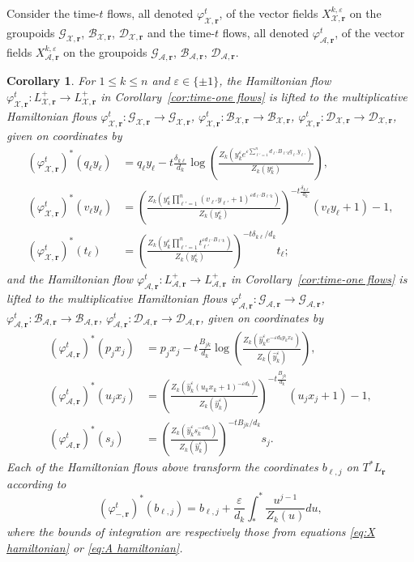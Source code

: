 \documentclass{amsart}
\newtheorem{corollary}[theorem]{Corollary}
\numberwithin{equation}{section}
\newcommand{\bfr}{{\boldsymbol{r}}}
\newcommand{\cA}{\mathcal{A}}
\newcommand{\cB}{\mathcal{B}}
\newcommand{\cD}{\mathcal{D}}
\newcommand{\cG}{\mathcal{G}}
\newcommand{\cX}{\mathcal{X}}
\begin{document}
Consider the time-$t$ flows, all denoted $\varphi_{\cX,\bfr}^t$, of the vector fields $X_{\cX,\bfr}^{k,\varepsilon}$ on the groupoids $\cG_{\cX,\bfr}$, $\cB_{\cX,\bfr}$, $\cD_{\cX,\bfr}$ and the time-$t$ flows, all denoted $\varphi_{\cA,\bfr}^t$, of the vector fields $X_{\cA,\bfr}^{k,\varepsilon}$ on the groupoids $\cG_{\cA,\bfr}$, $\cB_{\cA,\bfr}$, $\cD_{\cA,\bfr}$.
\begin{corollary}
  \label{cor:groupoid hamiltonian flows}
  For $1\le k\le n$ and $\varepsilon\in\{\pm1\}$, the Hamiltonian flow $\varphi_{\cX,\bfr}^t: L^+_{\cX,\bfr} \to L^+_{\cX,\bfr}$ in Corollary~\ref{cor:time-one flows} is lifted to the multiplicative Hamiltonian flows $\varphi_{\cX,\bfr}^t: \cG_{\cX,\bfr} \to \cG_{\cX,\bfr}$, $\varphi_{\cX,\bfr}^t: \cB_{\cX,\bfr} \to \cB_{\cX,\bfr}$, $\varphi_{\cX,\bfr}^t: \cD_{\cX,\bfr} \to \cD_{\cX,\bfr}$, given on coordinates by
  \begin{align*}
    (\varphi_{\cX,\bfr}^t)^*(q_\ell y_\ell)&=q_\ell y_\ell-t\frac{\delta_{k\ell}}{d_k}\log\left(\frac{Z_k\left(y_k^\varepsilon e^{\varepsilon\sum_{\ell'=1}^n d_{\ell'} B_{\ell' k}q_{\ell'} y_{\ell'}}\right)}{Z_k(y_k^\varepsilon)}\right),\\
    (\varphi_{\cX,\bfr}^t)^*(v_\ell y_\ell)&=\left(\frac{Z_k\left(y_k^\varepsilon \prod_{\ell'=1}^n (v_{\ell'} y_{\ell'} + 1)^{\varepsilon d_{\ell'} B_{\ell' k}}\right)}{Z_k(y_k^\varepsilon)}\right)^{-t\frac{\delta_{k\ell}}{d_k}}(v_\ell y_\ell+1)-1,\\
    (\varphi_{\cX,\bfr}^t)^*(t_\ell)&=\left(\frac{Z_k\left(y_k^\varepsilon \prod_{\ell'=1}^n t_{\ell'}^{\varepsilon d_{\ell'} B_{\ell' k}}\right)}{Z_k(y_k^\varepsilon)}\right)^{-t\delta_{k\ell}/d_k}t_\ell;
  \end{align*}
  and the Hamiltonian flow $\varphi_{\cA,\bfr}^t: L^+_{\cA,\bfr} \to L^+_{\cA,\bfr}$ in Corollary~\ref{cor:time-one flows} is lifted to the multiplicative Hamiltonian flows $\varphi_{\cA,\bfr}^t: \cG_{\cA,\bfr} \to \cG_{\cA,\bfr}$, $\varphi_{\cA,\bfr}^t: \cB_{\cA,\bfr} \to \cB_{\cA,\bfr}$, $\varphi_{\cA,\bfr}^t: \cD_{\cA,\bfr} \to \cD_{\cA,\bfr}$, given on coordinates by
  \begin{align*}
    (\varphi_{\cA,\bfr}^t)^*(p_jx_j)&=p_jx_j-t\frac{B_{jk}}{d_k}\log\left(\frac{Z_k\left(\hat y_k^\varepsilon e^{-\varepsilon d_kp_kx_k}\right)}{Z_k(\hat y_k^\varepsilon)}\right), \\
    (\varphi_{\cA,\bfr}^t)^*(u_jx_j)&=\left(\frac{Z_k\left(\hat y_k^\varepsilon (u_kx_k+1)^{-\varepsilon d_k}\right)}{Z_k(\hat y_k^\varepsilon)}\right)^{-t\frac{B_{jk}}{d_k}}(u_jx_j+1)-1, \\
    (\varphi_{\cA,\bfr}^t)^*(s_j)&=\left(\frac{Z_k\left(\hat y_k^\varepsilon s_k^{-\varepsilon d_k}\right)}{Z_k(\hat y_k^\varepsilon)}\right)^{-tB_{jk}/d_k}s_j.
  \end{align*}
  Each of the Hamiltonian flows above transform the coordinates $b_{\ell,j}$ on $T^*L_\bfr$ according to
  \begin{equation*}
    (\varphi_{-,\bfr}^t)^*(b_{\ell,j})=b_{\ell,j}+\frac{\varepsilon}{d_k}\int_*^* \frac{u^{j-1}}{Z_k(u)}du,
  \end{equation*}
  where the bounds of integration are respectively those from equations \eqref{eq:X hamiltonian} or \eqref{eq:A hamiltonian}.
\end{corollary}
\end{document}
